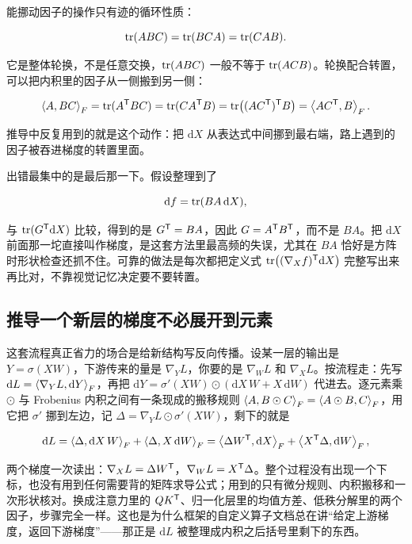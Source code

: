 能挪动因子的操作只有迹的循环性质：

\[
\operatorname{tr}(ABC)=\operatorname{tr}(BCA)=\operatorname{tr}(CAB).
\]

它是整体轮换，不是任意交换，\(\operatorname{tr}(ABC)\) 一般不等于 \(\operatorname{tr}(ACB)\)。轮换配合转置，可以把内积里的因子从一侧搬到另一侧：

\[
\left\langle A,BC\right\rangle_F=\operatorname{tr}(A^{\mathsf{T}}BC)=\operatorname{tr}(CA^{\mathsf{T}}B)
=\operatorname{tr}\bigl((AC^{\mathsf{T}})^{\mathsf{T}}B\bigr)=\left\langle AC^{\mathsf{T}},B\right\rangle_F.
\]

推导中反复用到的就是这个动作：把 \(\mathrm dX\) 从表达式中间挪到最右端，路上遇到的因子被吞进梯度的转置里面。

出错最集中的是最后那一下。假设整理到了

\[
\mathrm df=\operatorname{tr}(BA\,\mathrm dX),
\]

与 \(\operatorname{tr}(G^{\mathsf{T}}\mathrm dX)\) 比较，得到的是 \(G^{\mathsf{T}}=BA\)，因此 \(G=A^{\mathsf{T}}B^{\mathsf{T}}\)，而不是 \(BA\)。把 \(\mathrm dX\) 前面那一坨直接叫作梯度，是这套方法里最高频的失误，尤其在 \(BA\) 恰好是方阵时形状检查还抓不住。可靠的做法是每次都把定义式 \(\operatorname{tr}\bigl((\nabla_X f)^{\mathsf{T}}\mathrm dX\bigr)\) 完整写出来再比对，不靠视觉记忆决定要不要转置。

\subsection{推导一个新层的梯度不必展开到元素}

这套流程真正省力的场合是给新结构写反向传播。设某一层的输出是 \(Y=\sigma(XW)\)，下游传来的量是 \(\nabla_Y L\)，你要的是 \(\nabla_W L\) 和 \(\nabla_X L\)。按流程走：先写 \(\mathrm dL=\left\langle\nabla_Y L,\mathrm dY\right\rangle_F\)，再把 \(\mathrm dY=\sigma'(XW)\odot(\mathrm dX\,W+X\,\mathrm dW)\) 代进去。逐元素乘 \(\odot\) 与 Frobenius 内积之间有一条现成的搬移规则 \(\left\langle A,B\odot C\right\rangle_F=\left\langle A\odot B,C\right\rangle_F\)，用它把 \(\sigma'\) 挪到左边，记 \(\Delta=\nabla_Y L\odot\sigma'(XW)\)，剩下的就是

\[
\mathrm dL=\left\langle\Delta,\mathrm dX\,W\right\rangle_F+\left\langle\Delta,X\,\mathrm dW\right\rangle_F
=\left\langle\Delta W^{\mathsf{T}},\mathrm dX\right\rangle_F+\left\langle X^{\mathsf{T}}\Delta,\mathrm dW\right\rangle_F,
\]

两个梯度一次读出：\(\nabla_X L=\Delta W^{\mathsf{T}}\)，\(\nabla_W L=X^{\mathsf{T}}\Delta\)。整个过程没有出现一个下标，也没有用到任何需要背的矩阵求导公式；用到的只有微分规则、内积搬移和一次形状核对。换成注意力里的 \(QK^{\mathsf{T}}\)、归一化层里的均值方差、低秩分解里的两个因子，步骤完全一样。这也是为什么框架的自定义算子文档总在讲``给定上游梯度，返回下游梯度''——那正是 \(\mathrm dL\) 被整理成内积之后括号里剩下的东西。


